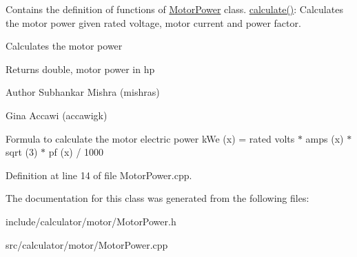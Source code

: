 Contains the definition of functions of \hyperlink{class_motor_power}{Motor\+Power} class. \hyperlink{class_motor_power_a0beab572e5c46a01e474d6403ec81cf4}{calculate()}\+: Calculates the motor power given rated voltage, motor current and power factor. 

Calculates the motor power \begin{DoxyReturn}{Returns}
double, motor power in hp
\end{DoxyReturn}
\begin{DoxyAuthor}{Author}
Subhankar Mishra (mishras) 

Gina Accawi (accawigk) 
\end{DoxyAuthor}
Formula to calculate the motor electric power k\+We (x) = rated volts $\ast$ amps (x) $\ast$ sqrt (3) $\ast$ pf (x) / 1000

Definition at line 14 of file Motor\+Power.\+cpp.



The documentation for this class was generated from the following files\+:\begin{DoxyCompactItemize}
\item 
include/calculator/motor/Motor\+Power.\+h\item 
src/calculator/motor/Motor\+Power.\+cpp\end{DoxyCompactItemize}
